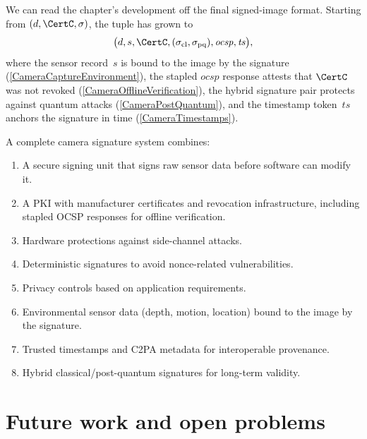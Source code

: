 
We can read the chapter's development off the final signed-image format.
Starting from \((d, \CertC, \sigma)\), the tuple has grown to
\[
  \bigl(d, s, \CertC, (\sigma_{\text{cl}}, \sigma_{\text{pq}}),
  \mathit{ocsp}, \mathit{ts}\bigr),
\]
where the sensor record~\(s\) is bound to the image by the signature
(\cref{CameraCaptureEnvironment}), the stapled \(\mathit{ocsp}\) response
attests that \(\CertC\) was not revoked
(\cref{CameraOfflineVerification}), the hybrid signature pair protects
against quantum attacks (\cref{CameraPostQuantum}), and the timestamp
token~\(\mathit{ts}\) anchors the signature in time
(\cref{CameraTimestamps}).

A complete camera signature system combines:
\begin{enumerate}
  \item A secure signing unit that signs raw sensor data before software
    can modify it.
  \item A \ac{PKI} with manufacturer certificates and revocation
    infrastructure, including stapled OCSP responses for offline
    verification.
  \item Hardware protections against side-channel attacks.
  \item Deterministic signatures to avoid nonce-related vulnerabilities.
  \item Privacy controls based on application requirements.
  \item Environmental sensor data (depth, motion, location) bound to the
    image by the signature.
  \item Trusted timestamps and C2PA metadata for interoperable provenance.
  \item Hybrid classical/post-quantum signatures for long-term validity.
\end{enumerate}


\section{Future work and open problems}\label{CameraFutureWork}


